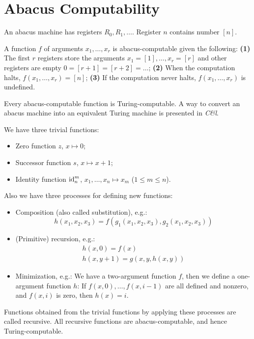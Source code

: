 \section{Abacus Computability} %
\label{sec:abacus_computability}
An abacus machine has registers $R_0, R_1, \ldots$.
Register $n$ contains number $[n]$.

A function $f$ of arguments $x_1,\ldots,x_r$ is abacus-computable given the following: \textbf{(1)} The first $r$ registers store the arguments $x_1 = [1],\ldots,x_r=[r]$ and other registers are empty $0=[r+1]=[r+2]=\ldots$; \textbf{(2)} When the computation halts, $f(x_1,\ldots,x_r)=[n]$; \textbf{(3)} If the computation never halts, $f(x_1,\ldots,x_r)$ is undefined.

Every abacus-computable function is Turing-computable.
A way to convert an abacus machine into an equivalent Turing machine is presented in \emph{C\&l}.

We have three trivial functions:
\begin{itemize}
  \item Zero function $z$, $x \mapsto 0$;
  \item Successor function $s$, $x \mapsto x+1$;
  \item Identity function $\operatorname{id}^m_n$, $x_1,\ldots,x_n \mapsto x_m$ ($1 \le m \le n$).
\end{itemize}

Also we have three processes for defining new functions:
\begin{itemize}
  \item Composition (also called substitution), e.g.:
  \begin{equation*}
    h(x_1,x_2,x_3) = f(g_1(x_1,x_2,x_3), g_2(x_1,x_2,x_3))
  \end{equation*}
  \item (Primitive) recursion, e.g.:
  \begin{gather*}
    h(x,0) = f(x)\\
    h(x,y+1) = g(x,y,h(x,y))
  \end{gather*}
  \item Minimization, e.g.: We have a two-argument function $f$, then we define a one-argument function $h$: If $f(x,0),\ldots,f(x,i-1)$ are all defined and nonzero, and $f(x,i)$ is zero, then $h(x)=i$.
\end{itemize}

Functions obtained from the trivial functions by applying these processes are called recursive.
All recursive functions are abacus-computable, and hence Turing-computable.
